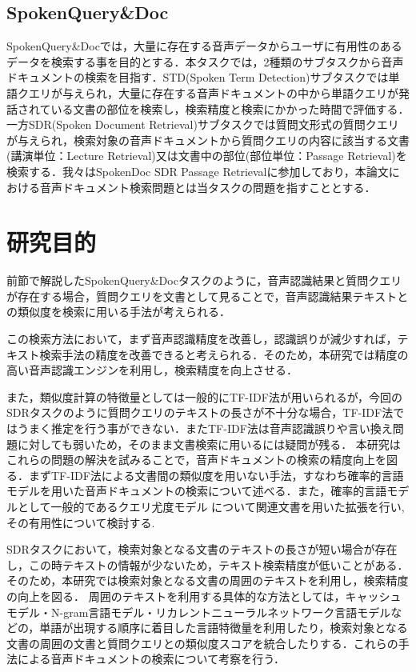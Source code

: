 \subsection{SpokenQuery\&Doc}
SpokenQuery\&Docでは，大量に存在する音声データからユーザに有用性のあるデータを検索する事を目的とする．本タスクでは，2種類のサブタスクから音声ドキュメントの検索を目指す．STD(Spoken Term Detection)サブタスクでは単語クエリが与えられ，大量に存在する音声ドキュメントの中から単語クエリが発話されている文書の部位を検索し，検索精度と検索にかかった時間で評価する．一方SDR(Spoken Document Retrieval)サブタスクでは質問文形式の質問クエリが与えられ，検索対象の音声ドキュメントから質問クエリの内容に該当する文書(講演単位：Lecture Retrieval)又は文書中の部位(部位単位：Passage Retrieval)を検索する．我々はSpokenDoc SDR Passage Retrievalに参加しており，本論文における音声ドキュメント検索問題とは当タスクの問題を指すこととする．

\section{研究目的}
前節で解説したSpokenQuery\&Docタスクのように，音声認識結果と質問クエリが存在する場合，質問クエリを文書として見ることで，音声認識結果テキストとの類似度を検索に用いる手法が考えられる．

この検索方法において，まず音声認識精度を改善し，認識誤りが減少すれば，テキスト検索手法の精度を改善できると考えられる．そのため，本研究では精度の高い音声認識エンジンを利用し，検索精度を向上させる．

また，類似度計算の特徴量としては一般的にTF-IDF法が用いられるが，今回のSDRタスクのように質問クエリのテキストの長さが不十分な場合，TF-IDF法ではうまく推定を行う事ができない．またTF-IDF法は音声認識誤りや言い換え問題に対しても弱いため，そのまま文書検索に用いるには疑問が残る．
本研究はこれらの問題の解決を試みることで，音声ドキュメントの検索の精度向上を図る．まずTF-IDF法による文書間の類似度を用いない手法，すなわち確率的言語モデルを用いた音声ドキュメントの検索について述べる．また，確率的言語モデルとして一般的であるクエリ尤度モデル \cite{query_likelihood}について関連文書を用いた拡張を行い,その有用性について検討する.

SDRタスクにおいて，検索対象となる文書のテキストの長さが短い場合が存在し，この時テキストの情報が少ないため，テキスト検索精度が低いことがある．そのため，本研究では検索対象となる文書の周囲のテキストを利用し，検索精度の向上を図る．
周囲のテキストを利用する具体的な方法としては，キャッシュモデル・N-gram言語モデル・リカレントニューラルネットワーク言語モデルなどの，単語が出現する順序に着目した言語特徴量を利用したり，検索対象となる文書の周囲の文書と質問クエリとの類似度スコアを統合したりする．これらの手法による音声ドキュメントの検索について考察を行う．

